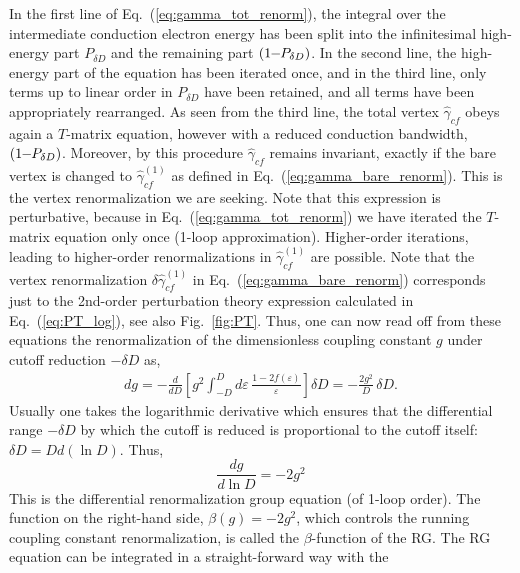\documentclass[12pt,twoside]{article}
\newcommand{\Eq}[1]{Eq.~(\ref{#1})}
\begin{document}
In the first line of \Eq{eq:gamma_tot_renorm}, the integral over the 
intermediate conduction electron energy has been split into the 
infinitesimal high-energy part $P_{\delta D}$ and the remaining part   
$(1\hspace*{-0.1cm}-\hspace*{-0.1cm}P_{\delta D})$. In the second line,
the high-energy part of the equation has been iterated once, and in the 
third line, only terms up to linear order in $P_{\delta D}$ have been retained, 
and all terms have been appropriately rearranged.  
As seen from the third line, the total vertex $\hat\gamma_{cf}$ 
obeys again a $T$-matrix equation, however with a reduced conduction 
bandwidth, $(1\hspace*{-0.1cm}-\hspace{-0.1cm}P_{\delta D})$. Moreover, 
by this procedure $\hat\gamma_{cf}$ remains invariant, exactly if 
the bare vertex is changed to $\hat\gamma_{cf}^{(1)}$ as defined in 
\Eq{eq:gamma_bare_renorm}. This is the vertex renormalization we are 
seeking. Note that this expression is perturbative, because in 
\Eq{eq:gamma_tot_renorm} we have iterated the $T$-matrix equation only 
once (1-loop approximation). Higher-order iterations, leading to 
higher-order renormalizations in $\hat\gamma_{cf}^{(1)}$ are possible.   
Note that the vertex renormalization $\delta\hat\gamma_{cf}^{(1)}$ in 
\Eq{eq:gamma_bare_renorm} corresponds just to the 2nd-order 
perturbation theory expression calculated in \Eq{eq:PT_log}, see also 
Fig.~\ref{fig:PT}. Thus, 
one can now read off from these equations the renormalization of the 
dimensionless coupling constant $g$ under cutoff reduction $-\delta D$ as,
\begin{eqnarray}
dg= -\frac{d}{dD} \left[  g^2 \int_{-D}^{D} d\varepsilon\,
\frac{1-2f(\varepsilon)}{\varepsilon}\right] \delta D = -\frac{2 g^2}{D} \,
\delta D.
\end{eqnarray}
Usually one takes the logarithmic derivative which ensures that the 
differential range $-\delta D$ by which the cutoff is reduced is proportional 
to the cutoff itself: $\delta D=Dd(\ln D)$. Thus,
\begin{equation}
\frac{dg}{d\ln D} = - 2 g^2
\label{eq:RGequation0}
\end{equation}
This is the differential renormalization group equation (of 1-loop order).
The function on the right-hand side, $\beta(g)=-2g^2$, 
which controls the running coupling constant renormalization, 
is called the $\beta$-function of the RG. 
The RG equation can be integrated in a straight-forward way with the 
\end{document}
